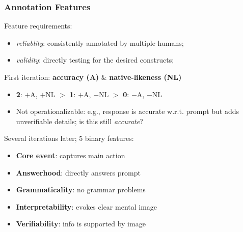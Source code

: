 \documentclass[handout,xcolor={dvipsnames}]{beamer}
\begin{document}
\begin{frame}
\frametitle{Annotation Features}
\pause
Feature requirements:
\begin{itemize}
\pause
\item \textit{reliablity}: consistently annotated by multiple humans;
\pause
\item \textit{validity}: directly testing for the desired constructs;
\end{itemize}
\pause
First iteration: \textbf{accuracy (A)} \& \textbf{native-likeness (NL)}
\begin{itemize}
\pause
\item \textbf{2}: $+$A, $+$NL $>$ \textbf{1}: $+$A, $-$NL $>$ \textbf{0}: $-$A, $-$NL
\pause
\item Not operationalizable: e.g., response is accurate w.r.t. prompt but adds unverifiable details; is this still \textit{accurate}?
\end{itemize}
\pause
Several iterations later; 5 binary features:
\begin{itemize}
\pause
\item \textbf{Core event}: \pause captures main action
\pause
\item \textbf{Answerhood}: \pause directly answers prompt
\pause
\item \textbf{Grammaticality}: \pause no grammar problems
\pause
\item \textbf{Interpretability}: \pause evokes clear mental image
\pause
\item \textbf{Verifiability}: \pause info is supported by image
\end{itemize}


\end{frame}
\end{document}
